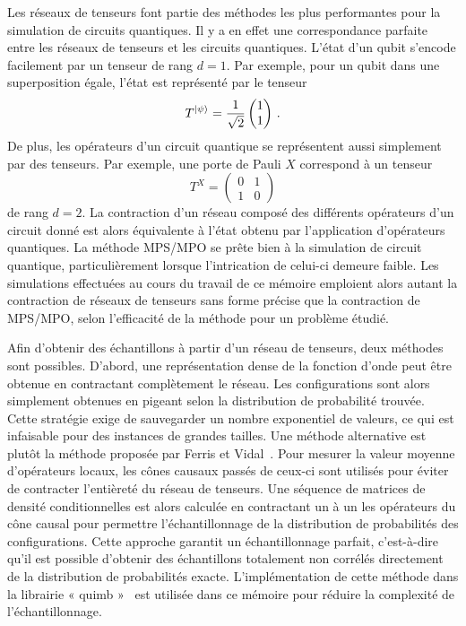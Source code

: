 Les réseaux de tenseurs font partie des méthodes les plus performantes pour la simulation de circuits quantiques. Il y a en effet une correspondance parfaite entre les réseaux de tenseurs et les circuits quantiques. L'état d'un qubit s'encode facilement par un tenseur de rang $d = 1$. Par exemple, pour un qubit dans une superposition égale, l'état est représenté par le tenseur
\begin{equation}
    T^{\ket{\psi}} = \frac{1}{\sqrt{2}}
    \begin{pmatrix}
        1 \\
        1
    \end{pmatrix} \,.
\end{equation}
De plus, les opérateurs d'un circuit quantique se représentent aussi simplement par des tenseurs. Par exemple, une porte de Pauli $X$ correspond à un tenseur 
\begin{equation}
    T^{X} = 
    \begin{pmatrix}
        0 & 1 \\
        1 & 0
    \end{pmatrix}
\end{equation}
de rang $d = 2$. La contraction d'un réseau composé des différents opérateurs d'un circuit donné est alors équivalente à l'état obtenu par l'application d'opérateurs quantiques. La méthode MPS/MPO se prête bien à la simulation de circuit quantique, particulièrement lorsque l'intrication de celui-ci demeure faible. Les simulations effectuées au cours du travail de ce mémoire emploient alors autant la contraction de réseaux de tenseurs sans forme précise que la contraction de MPS/MPO, selon l'efficacité de la méthode pour un problème étudié.

Afin d'obtenir des échantillons à partir d'un réseau de tenseurs, deux méthodes sont possibles. D'abord, une représentation dense de la fonction d'onde peut être obtenue en contractant complètement le réseau. Les configurations sont alors simplement obtenues en pigeant selon la distribution de probabilité trouvée. Cette stratégie exige de sauvegarder un nombre exponentiel de valeurs, ce qui est infaisable pour des instances de grandes tailles. Une méthode alternative est plutôt la méthode proposée par Ferris et Vidal~\cite{ferrisPerfectSamplingUnitary2012}. Pour mesurer la valeur moyenne d'opérateurs locaux, les cônes causaux passés de ceux-ci sont utilisés pour éviter de contracter l'entièreté du réseau de tenseurs. Une séquence de matrices de densité conditionnelles est alors calculée en contractant un à un les opérateurs du cône causal pour permettre l'échantillonnage de la distribution de probabilités des configurations. Cette approche garantit un échantillonnage parfait, c'est-à-dire qu'il est possible d'obtenir des échantillons totalement non corrélés directement de la distribution de probabilités exacte. L'implémentation de cette méthode dans la librairie « quimb »~\cite{grayQuimbPythonPackage2018} est utilisée dans ce mémoire pour réduire la complexité de l'échantillonnage.

